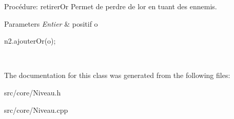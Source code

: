 Procédure\+: retirer\+Or Permet de perdre de l\textquotesingle{}or en tuant des ennemis. 


\begin{DoxyParams}{Parameters}
{\em Entier} & positif o 
\begin{DoxyCode}
n2.ajouterOr(o);
\end{DoxyCode}
 \\
\hline
\end{DoxyParams}


The documentation for this class was generated from the following files\+:\begin{DoxyCompactItemize}
\item 
src/core/Niveau.\+h\item 
src/core/Niveau.\+cpp\end{DoxyCompactItemize}
